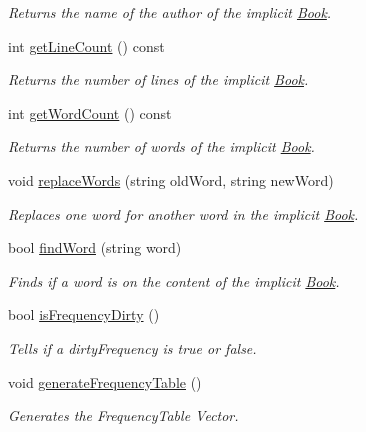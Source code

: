 \begin{DoxyCompactItemize}
\begin{DoxyCompactList}\small\item\em Returns the name of the author of the implicit \hyperlink{class_book}{Book}. \end{DoxyCompactList}\item 
int \hyperlink{class_book_abd9ca114f4909a735c7cb017920b30e4}{get\+Line\+Count} () const 
\begin{DoxyCompactList}\small\item\em Returns the number of lines of the implicit \hyperlink{class_book}{Book}. \end{DoxyCompactList}\item 
int \hyperlink{class_book_a32d34e718a05a927ab0aa17bfa9baead}{get\+Word\+Count} () const 
\begin{DoxyCompactList}\small\item\em Returns the number of words of the implicit \hyperlink{class_book}{Book}. \end{DoxyCompactList}\item 
void \hyperlink{class_book_aaf182e24b86624b6ff54fba2581094a4}{replace\+Words} (string old\+Word, string new\+Word)
\begin{DoxyCompactList}\small\item\em Replaces one word for another word in the implicit \hyperlink{class_book}{Book}. \end{DoxyCompactList}\item 
bool \hyperlink{class_book_af3ceb5ae5d66adf4d594cac8d29294fc}{find\+Word} (string word)
\begin{DoxyCompactList}\small\item\em Finds if a word is on the content of the implicit \hyperlink{class_book}{Book}. \end{DoxyCompactList}\item 
bool \hyperlink{class_book_aec01aa24087b313f36cc0fe3c4664f84}{is\+Frequency\+Dirty} ()
\begin{DoxyCompactList}\small\item\em Tells if a dirty\+Frequency is true or false. \end{DoxyCompactList}\item 
void \hyperlink{class_book_a8d232eaeb4207707d77bc18e6dd467cd}{generate\+Frequency\+Table} ()
\begin{DoxyCompactList}\small\item\em Generates the Frequency\+Table Vector. \end{DoxyCompactList}\item 

\end{DoxyCompactItemize}
